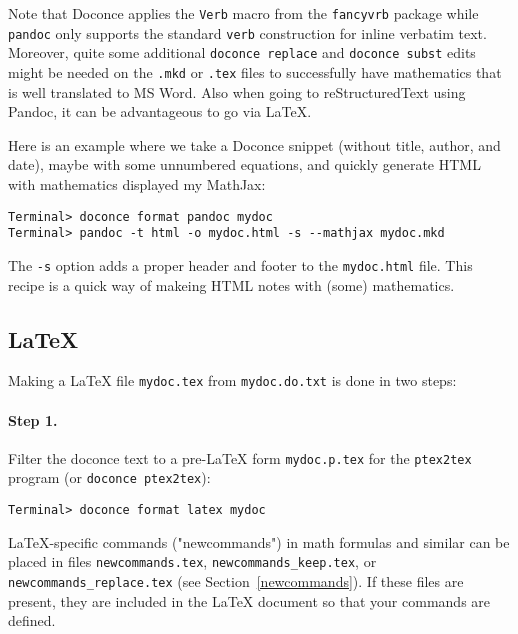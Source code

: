 \documentclass[%
oneside,                 %
final,                   %
10pt]{article}
\begin{document}
{{{Note that Doconce applies the {\fontsize{10pt}{10pt}\Verb!Verb!} macro from the {\fontsize{10pt}{10pt}\Verb!fancyvrb!} package
while {\fontsize{10pt}{10pt}\Verb!pandoc!} only supports the standard {\fontsize{10pt}{10pt}\Verb!verb!} construction for
inline verbatim text.  Moreover, quite some additional {\fontsize{10pt}{10pt}\Verb!doconce replace!} and {\fontsize{10pt}{10pt}\Verb!doconce subst!} edits might be needed on the {\fontsize{10pt}{10pt}\Verb!.mkd!} or
{\fontsize{10pt}{10pt}\Verb!.tex!} files to successfully have mathematics that is well translated
to MS Word.  Also when going to reStructuredText using Pandoc, it can
be advantageous to go via {\LaTeX}.

Here is an example where we take a Doconce snippet (without title, author,
and date), maybe with some unnumbered equations, and quickly generate
HTML with mathematics displayed my MathJax:
\vspace{4pt}
\begin{Verbatim}[numbers=none,frame=lines,label=\fbox{{\tiny Terminal}},fontsize=\fontsize{9pt}{9pt},
labelposition=topline,framesep=2.5mm,framerule=0.7pt]
Terminal> doconce format pandoc mydoc
Terminal> pandoc -t html -o mydoc.html -s --mathjax mydoc.mkd
\end{Verbatim}
The {\fontsize{10pt}{10pt}\Verb!-s!} option adds a proper header and footer to the {\fontsize{10pt}{10pt}\Verb!mydoc.html!} file.
This recipe is a quick way of makeing HTML notes with (some) mathematics.

\subsection{{\LaTeX}}

Making a {\LaTeX} file {\fontsize{10pt}{10pt}\Verb!mydoc.tex!} from {\fontsize{10pt}{10pt}\Verb!mydoc.do.txt!} is done in two steps:

\paragraph{Step 1.}
Filter the doconce text to a pre-LaTeX form {\fontsize{10pt}{10pt}\Verb!mydoc.p.tex!} for
the {\fontsize{10pt}{10pt}\Verb!ptex2tex!} program (or {\fontsize{10pt}{10pt}\Verb!doconce ptex2tex!}):
\vspace{4pt}
\begin{Verbatim}[numbers=none,frame=lines,label=\fbox{{\tiny Terminal}},fontsize=\fontsize{9pt}{9pt},
labelposition=topline,framesep=2.5mm,framerule=0.7pt]
Terminal> doconce format latex mydoc
\end{Verbatim}
LaTeX-specific commands ("newcommands") in math formulas and similar
can be placed in files {\fontsize{10pt}{10pt}\Verb!newcommands.tex!}, {\fontsize{10pt}{10pt}\Verb!newcommands_keep.tex!}, or
{\fontsize{10pt}{10pt}\Verb!newcommands_replace.tex!} (see Section~\ref{newcommands}).
If these files are present, they are included in the {\LaTeX} document
so that your commands are defined.

}}}
\end{document}
